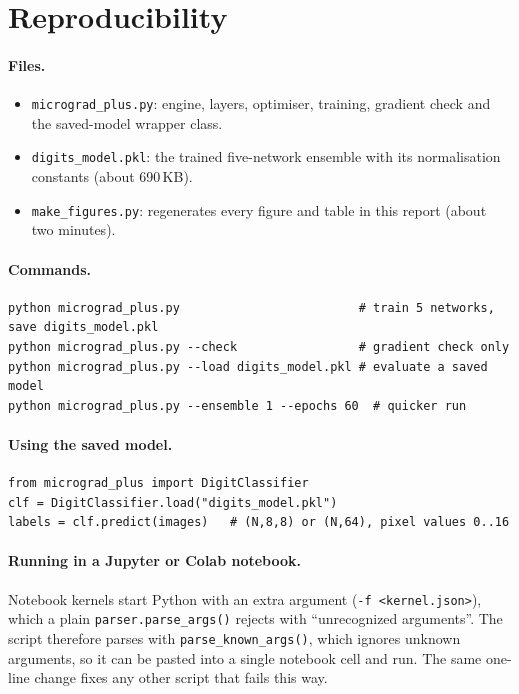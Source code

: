 \documentclass[11pt,a4paper]{article}
\newcommand{\code}[1]{\texttt{#1}}
\begin{document}
\section{Reproducibility}
\paragraph{Files.}
\begin{itemize}
  \item \code{micrograd\_plus.py}: engine, layers, optimiser, training, gradient check and the saved-model wrapper class.
  \item \code{digits\_model.pkl}: the trained five-network ensemble with its normalisation constants (about 690\,KB).
  \item \code{make\_figures.py}: regenerates every figure and table in this report (about two minutes).
\end{itemize}

\paragraph{Commands.}
\begin{lstlisting}[numbers=none]
python micrograd_plus.py                         # train 5 networks, save digits_model.pkl
python micrograd_plus.py --check                 # gradient check only
python micrograd_plus.py --load digits_model.pkl # evaluate a saved model
python micrograd_plus.py --ensemble 1 --epochs 60  # quicker run
\end{lstlisting}

\paragraph{Using the saved model.}
\begin{lstlisting}[numbers=none]
from micrograd_plus import DigitClassifier
clf = DigitClassifier.load("digits_model.pkl")
labels = clf.predict(images)   # (N,8,8) or (N,64), pixel values 0..16
\end{lstlisting}

\paragraph{Running in a Jupyter or Colab notebook.} Notebook kernels start Python with an extra argument (\code{-f <kernel.json>}), which a plain \code{parser.parse\_args()} rejects with ``unrecognized arguments''. The script therefore parses with \code{parse\_known\_args()}, which ignores unknown arguments, so it can be pasted into a single notebook cell and run. The same one-line change fixes any other script that fails this way.
\end{document}

